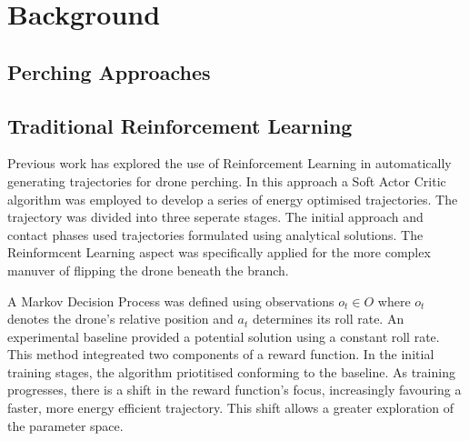 \chapter{Background}



\section{Perching Approaches}

\section{Traditional Reinforcement Learning}

Previous work has explored the use of Reinforcement Learning in automatically generating trajectories for drone perching\cite{learnedTetheredPerchingFabian}.
In this approach a Soft Actor Critic algorithm was employed to develop a series of energy optimised trajectories.
The trajectory was divided into three seperate stages.
The initial approach and contact phases used trajectories formulated using analytical solutions.
The Reinformcent Learning aspect was specifically applied for the more complex manuver of flipping the drone beneath the branch.

A Markov Decision Process was defined using observations $o_{t} \in O$ where $o_{t}$ denotes the drone's relative position and $a_{t}$ determines its roll rate.
An experimental baseline provided a potential solution using a constant roll rate.
This method integreated two components of a reward function.
In the initial training stages, the algorithm priotitised conforming to the baseline.
As training progresses, there is a shift in the reward function's focus, increasingly favouring a faster, more energy efficient trajectory.
This shift allows a greater exploration of the parameter space.

